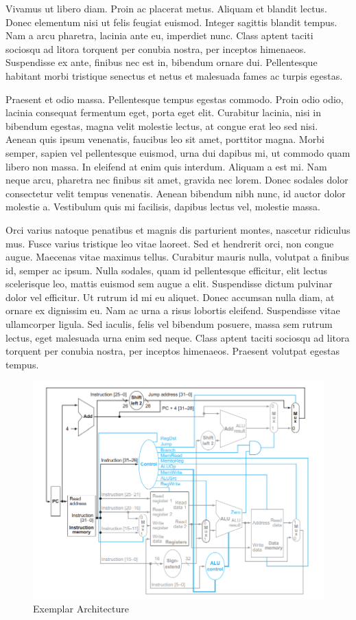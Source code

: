 \documentclass[10pt]{datasheet}
\begin{document}
Vivamus ut libero diam. Proin ac placerat metus. Aliquam et blandit lectus. Donec elementum nisi ut felis feugiat euismod. Integer sagittis blandit tempus. Nam a arcu pharetra, lacinia ante eu, imperdiet nunc. Class aptent taciti sociosqu ad litora torquent per conubia nostra, per inceptos himenaeos. Suspendisse ex ante, finibus nec est in, bibendum ornare dui. Pellentesque habitant morbi tristique senectus et netus et malesuada fames ac turpis egestas.

Praesent et odio massa. Pellentesque tempus egestas commodo. Proin odio odio, lacinia consequat fermentum eget, porta eget elit. Curabitur lacinia, nisi in bibendum egestas, magna velit molestie lectus, at congue erat leo sed nisi. Aenean quis ipsum venenatis, faucibus leo sit amet, porttitor magna. Morbi semper, sapien vel pellentesque euismod, urna dui dapibus mi, ut commodo quam libero non massa. In eleifend at enim quis interdum. Aliquam a est mi. Nam neque arcu, pharetra nec finibus sit amet, gravida nec lorem. Donec sodales dolor consectetur velit tempus venenatis. Aenean bibendum nibh nunc, id auctor dolor molestie a. Vestibulum quis mi facilisis, dapibus lectus vel, molestie massa.

Orci varius natoque penatibus et magnis dis parturient montes, nascetur ridiculus mus. Fusce varius tristique leo vitae laoreet. Sed et hendrerit orci, non congue augue. Maecenas vitae maximus tellus. Curabitur mauris nulla, volutpat a finibus id, semper ac ipsum. Nulla sodales, quam id pellentesque efficitur, elit lectus scelerisque leo, mattis euismod sem augue a elit. Suspendisse dictum pulvinar dolor vel efficitur. Ut rutrum id mi eu aliquet. Donec accumsan nulla diam, at ornare ex dignissim eu. Nam ac urna a risus lobortis eleifend. Suspendisse vitae ullamcorper ligula. Sed iaculis, felis vel bibendum posuere, massa sem rutrum lectus, eget malesuada urna enim sed neque. Class aptent taciti sociosqu ad litora torquent per conubia nostra, per inceptos himenaeos. Praesent volutpat egestas tempus.



\begin{figure}[h]
    \includegraphics[scale=0.8]{Assets/examplearch.PNG}
    \centering
    \captionsetup{justification=centering}
    \caption{Exemplar Architecture}
\end{figure}
\end{document}
